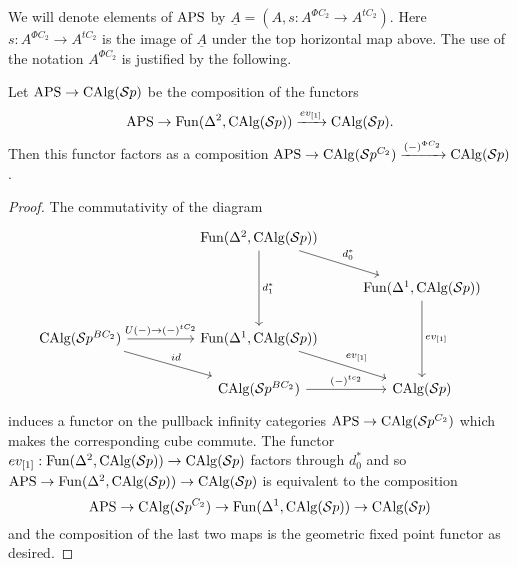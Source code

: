 We will denote elements of $\mathrm{APS}$ by $\underline{A}=(A,s:A^{\Phi C_2}\to A^{tC_2})$. Here $s:A^{\Phi C_2}\to A^{tC_2}$ is the image of $\underline{A}$ under the top horizontal map above. The use of the notation $A^{\Phi C_2}$ is justified by the following.

\begin{lem}
Let $\mathrm{APS}\to \operatorname{CAlg}(\mathcal{S}p)$ be the composition of the functors \[\mathrm{APS}\to \operatorname{Fun}(\Delta^2,\operatorname{CAlg}(\mathcal{S}p))\xrightarrow{ev_{[1]}}\operatorname{CAlg}(\mathcal{S}p).\] Then this functor factors as a composition $\mathrm{APS}\to \operatorname{CAlg}(\mathcal{S}p^{C_2})\xrightarrow{(-)^{\Phi C_2}}\operatorname{CAlg}(\mathcal{S}p)$. 
\end{lem}
\begin{proof}
The commutativity of the diagram
\[
\begin{tikzcd}
 & & \operatorname{Fun}(\Delta^2, \calg(\Sp)) \arrow[rd, "d_0^*"] \arrow[dd, "d_1^*"] & \\
 & & & \operatorname{Fun}(\Delta^1,\calg(\Sp)) \arrow[dd,"ev_{[1]}"]\\
\calg(\Sp^{BC_2}) \arrow[rr, "U(-)\to (-)^{tC_2}"] \arrow[rrd, "id"] & & \operatorname{Fun}(\Delta^1, \calg(\Sp)) \arrow[rd, "ev_{[1]}"] & \\
  & & \calg(\Sp^{BC_2}) \arrow[r, "(-)^{tc_2}"] & \calg(\Sp)
\end{tikzcd}
\] induces a functor on the pullback infinity categories $\mathrm{APS}\to \operatorname{CAlg}(\mathcal{S}p^{C_2})$ which makes the corresponding cube commute. The functor $ev_{[1]}:\operatorname{Fun}(\Delta^2, \operatorname{CAlg}(\mathcal{S}p))\to \operatorname{CAlg}(\mathcal{S}p)$ factors through $d_0^*$ and so $\mathrm{APS}\to \operatorname{Fun}(\Delta^2, \operatorname{CAlg}(\mathcal{S}p))\to \operatorname{CAlg}(\mathcal{S}p)$ is equivalent to the composition \[\mathrm{APS}\to \operatorname{CAlg}(\mathcal{S}p^{C_2})\to \operatorname{Fun}(\Delta^1,\operatorname{CAlg}(\mathcal{S}p))\to \operatorname{CAlg}(\mathcal{S}p)\] and the composition of the last two maps is the geometric fixed point functor as desired.
\end{proof}

